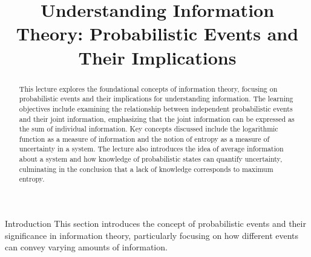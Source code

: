 \documentclass[12pt,a4paper]{article}
\title{Understanding Information Theory: Probabilistic Events and Their Implications}
\begin{document}
\maketitle
\begin{abstract}
This lecture explores the foundational concepts of information theory, focusing on probabilistic events and their implications for understanding information. The learning objectives include examining the relationship between independent probabilistic events and their joint information, emphasizing that the joint information can be expressed as the sum of individual information. Key concepts discussed include the logarithmic function as a measure of information and the notion of entropy as a measure of uncertainty in a system. The lecture also introduces the idea of average information about a system and how knowledge of probabilistic states can quantify uncertainty, culminating in the conclusion that a lack of knowledge corresponds to maximum entropy.
\end{abstract}

\begin{section}{Introduction}
This section introduces the concept of probabilistic events and their significance in information theory, particularly focusing on how different events can convey varying amounts of information.
\end{section}
\end{document}
